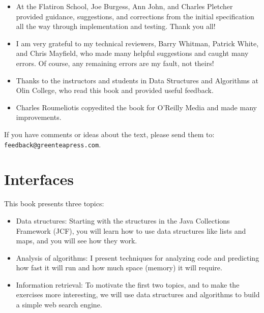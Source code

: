 \documentclass[12pt]{book}
\theoremstyle{exercise}
\begin{document}
\begin{itemize}

\item At the Flatiron School, Joe Burgess, Ann John, and Charles
  Pletcher provided guidance, suggestions, and corrections from the
  initial specification all the way through implementation and
  testing.  Thank you all!

\item I am very grateful to my technical reviewers, Barry Whitman,
  Patrick White, and Chris Mayfield, who made many helpful suggestions
  and caught many errors.  Of course, any remaining errors are my
  fault, not theirs!

\item Thanks to the instructors and students in Data Structures and
  Algorithms at Olin College, who read this book and provided useful
  feedback.

\item Charles Roumeliotis copyedited the book for O'Reilly Media
and made many improvements.


\end{itemize}



If you have comments or ideas about the text, please send
them to: {\tt feedback@greenteapress.com}.


\mainmatter

\chapter{Interfaces}
\label{cs-lists-programming-to-an-interface-readme}

This book presents three topics:

\begin{itemize}

\item Data structures: Starting with the structures in the Java
Collections Framework (JCF), you will learn how to use data structures
like lists and maps, and you will see how they work.


\item Analysis of algorithms: I present techniques for analyzing
code and predicting how fast it will run and how much space (memory) it
will require.


\item Information retrieval: To motivate the first two topics, and to
make the exercises more interesting, we will use data structures and
algorithms to build a simple web search engine.


\end{itemize}
\end{document}
